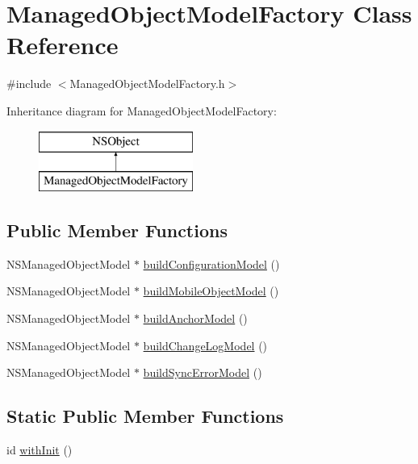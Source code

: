 \hypertarget{interface_managed_object_model_factory}{
\section{\-Managed\-Object\-Model\-Factory \-Class \-Reference}
\label{interface_managed_object_model_factory}
}


{\ttfamily \#include $<$\-Managed\-Object\-Model\-Factory.\-h$>$}

\-Inheritance diagram for \-Managed\-Object\-Model\-Factory\-:\begin{figure}[H]
\begin{center}
\leavevmode
\includegraphics[height=2.000000cm]{interface_managed_object_model_factory}
\end{center}
\end{figure}
\subsection*{\-Public \-Member \-Functions}
\begin{DoxyCompactItemize}
\item 
\-N\-S\-Managed\-Object\-Model $\ast$ \hyperlink{interface_managed_object_model_factory_a23a5d2699e4d871ed791791659381e7c}{build\-Configuration\-Model} ()
\item 
\-N\-S\-Managed\-Object\-Model $\ast$ \hyperlink{interface_managed_object_model_factory_a3346fcdf7a35b8d62023a658e9f9877e}{build\-Mobile\-Object\-Model} ()
\item 
\-N\-S\-Managed\-Object\-Model $\ast$ \hyperlink{interface_managed_object_model_factory_a4999b31d18371a68f4f73389e8fdcfdd}{build\-Anchor\-Model} ()
\item 
\-N\-S\-Managed\-Object\-Model $\ast$ \hyperlink{interface_managed_object_model_factory_aacdba9169dc11770a03706dd023fa5f9}{build\-Change\-Log\-Model} ()
\item 
\-N\-S\-Managed\-Object\-Model $\ast$ \hyperlink{interface_managed_object_model_factory_ac9ac945bfae6b30af5a622e3906957c2}{build\-Sync\-Error\-Model} ()
\end{DoxyCompactItemize}
\subsection*{\-Static \-Public \-Member \-Functions}
\begin{DoxyCompactItemize}
\item 
id \hyperlink{interface_managed_object_model_factory_a8b0c25350abca60312956ebf132c9c78}{with\-Init} ()
\end{DoxyCompactItemize}


